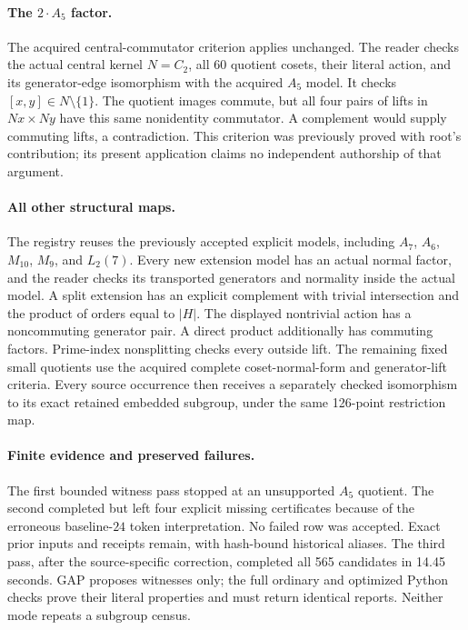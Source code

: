 \documentclass[11pt]{article}
\begin{document}
\paragraph{The $2\mathbin{\cdot}A_5$ factor.}
The acquired central-commutator criterion applies unchanged. The reader
checks the actual central kernel $N=C_2$, all 60 quotient cosets, their
literal action, and its generator-edge isomorphism with the acquired $A_5$
model. It checks $[x,y]\in N\setminus\{1\}$. The quotient images commute,
but all four pairs of lifts in $Nx\times Ny$ have this same nonidentity
commutator. A complement would supply commuting lifts, a contradiction.
This criterion was previously proved with root's contribution; its present
application claims no independent authorship of that argument.

\newpage
\paragraph{All other structural maps.}
The registry reuses the previously accepted explicit models, including
$A_7$, $A_6$, $M_{10}$, $M_9$, and $L_2(7)$. Every new extension model has
an actual normal factor, and the reader checks its transported generators
and normality inside the actual model. A split extension has an explicit
complement with trivial intersection and the product of orders equal to
$|H|$. The displayed nontrivial action has a noncommuting generator pair.
A direct product additionally has commuting factors. Prime-index nonsplitting
checks every outside lift. The remaining fixed small quotients use the
acquired complete coset-normal-form and generator-lift criteria. Every source
occurrence then receives a separately checked isomorphism to its exact
retained embedded subgroup, under the same 126-point restriction map.

\paragraph{Finite evidence and preserved failures.}
The first bounded witness pass stopped at an unsupported $A_5$ quotient.
The second completed but left four explicit missing certificates because
of the erroneous baseline-$24$ token interpretation. No failed row was
accepted. Exact prior inputs and receipts remain, with hash-bound historical
aliases. The third pass, after the source-specific correction, completed
all 565 candidates in 14.45 seconds. GAP proposes witnesses only; the full
ordinary and optimized Python checks prove their literal properties and
must return identical reports. Neither mode repeats a subgroup census.
\end{document}
